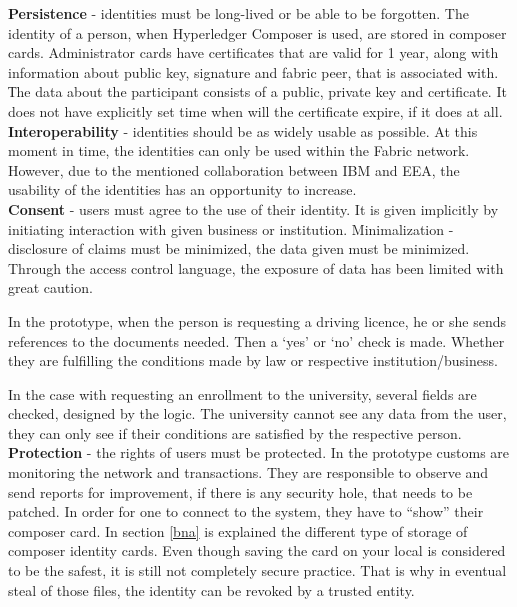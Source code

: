 \documentclass[a4paper,11pt]{report}
\begin{document}
\textbf{Persistence} - identities must be long-lived or be able to be forgotten. The identity of a person, when Hyperledger Composer is used, are stored in composer cards. Administrator cards have certificates that are valid for 1 year, along with information about public key, signature and fabric peer, that is associated with. 
Тhe data about the participant consists of a public, private key and certificate. It does not have explicitly set time when will the certificate expire, if it does at all. 
\\

\textbf{Interoperability} - identities should be as widely usable as possible. At this moment in time, the identities can only be used within the Fabric network. However, due to the mentioned collaboration between IBM and EEA, the usability of the identities has an opportunity to increase.  
\\

\textbf{Consent} - users must agree to the use of their identity. It is given implicitly by initiating interaction with given business or institution. 
Minimalization - disclosure of claims must be minimized, the data given must be minimized. Through the access control language, the exposure of data has been limited with great caution.
 
In the prototype, when the person is requesting a driving licence, he or she sends references to the documents needed. Then a ‘yes’ or ‘no’ check is made. Whether they are fulfilling the conditions made by law or respective institution/business. 

In the case with requesting an enrollment to the university, several fields are checked, designed by the logic. The university cannot see any data from the user, they can only see if their conditions are satisfied by the respective person. 
\\

\textbf{Protection} - the rights of users must be protected. In the prototype customs are monitoring the network and transactions. They are responsible to observe and send reports for improvement, if there is any security hole, that needs to be patched. 
In order for one to connect to the system, they have to “show” their composer card. In section \ref{bna} is explained the different type of storage of composer identity cards. Even though saving the card on your local is considered to be the safest, it is still not completely secure practice. That is why in eventual steal of those files, the identity can be revoked by a trusted entity. 
\end{document}
